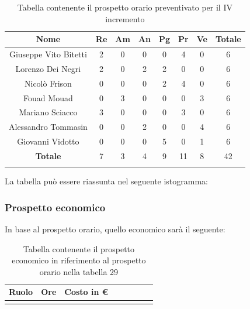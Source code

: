 			\begin{longtable}{|c|c|c|c|c|c|c|c}
				\hline
				\rowcolor{lighter-grayer}
				\textbf{Nome} & \textbf{Re} & \textbf{Am} & \textbf{An} & \textbf{Pg}  & \textbf{Pr}   & \textbf{Ve} & \textbf{Totale} \\
				\hline
				\endfirsthead
				\hline
				Giuseppe Vito Bitetti & 2 & 0 & 0 & 0 & 4 & 0 & 6\\
				\hline
				\hline
				Lorenzo Dei Negri & 2 & 0 & 2 & 2 & 0 & 0 & 6\\
				\hline
				\hline
				Nicolò Frison & 0 & 0 & 0 & 2 & 4 & 0 & 6\\
				\hline
				\hline
				Fouad Mouad & 0 & 3 & 0 & 0 & 0 & 3 & 6\\
				\hline
				\hline
				Mariano Sciacco & 3 & 0 & 0 & 0 & 3 & 0 & 6\\
				\hline
				\hline
				Alessandro Tommasin & 0 & 0 & 2 & 0 & 0 & 4 & 6\\
				\hline
				\hline
				Giovanni Vidotto & 0 & 0 & 0 & 5 & 0 & 1 & 6\\
				\hline 
				\textbf{Totale} & 7 &  3 & 4 & 9 & 11 & 8 & 42 \\
				\hline 
				
				\caption{Tabella contenente il prospetto orario preventivato per il IV incremento}
			\end{longtable}
			\pagebreak	
			
			La tabella può essere riassunta nel seguente istogramma:
			
			
		\subsubsection{Prospetto economico}
			In base al prospetto orario, quello economico sarà il seguente: 
			
			\begin{longtable}{|c|c|c|c|c|c|c|c}
				\hline
				\rowcolor{lighter-grayer}
				\textbf{Ruolo} & \textbf{Ore} & \textbf{Costo in €} \\
				\hline
				\endfirsthead
				
				\caption{Tabella contenente il prospetto economico in riferimento al prospetto orario nella tabella 29}
			\end{longtable}
			\pagebreak
			
